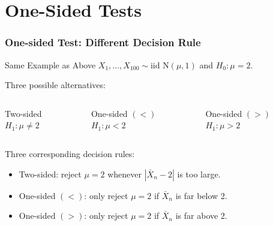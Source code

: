 \section{One-Sided Tests}
\begin{frame}
  \frametitle{One-sided Test: Different Decision Rule} 

  \begin{block}{Same Example as Above}
  $X_1, \dots, X_{100}\sim \mbox{iid N}(\mu, 1)$ and $H_0\colon \mu=2$. 
\end{block}

\begin{alertblock}{Three possible alternatives:}

  \begin{columns}
    \begin{block}{Two-sided}
      $H_1\colon \mu \neq 2$
    \end{block}
    \begin{block}{One-sided $(<)$}
      $H_1\colon \mu < 2$
    \end{block}
    \begin{block}{One-sided $(>)$}
      $H_1\colon \mu > 2$
    \end{block}
  \end{columns}
\end{alertblock}

\vspace{1em}

\begin{block}{Three corresponding decision rules:}
  \begin{itemize}
    \item Two-sided: reject $\mu = 2$ whenever $|\bar{X}_n - 2|$ is too large.
    \item One-sided $(<)$: only reject $\mu = 2$ if $\bar{X}_n$ is far \alert{below} 2.
    \item One-sided $(>)$: only reject $\mu = 2$ if $\bar{X}_n$ is far \alert{above} 2.
  \end{itemize}
\end{block}
\end{frame}
